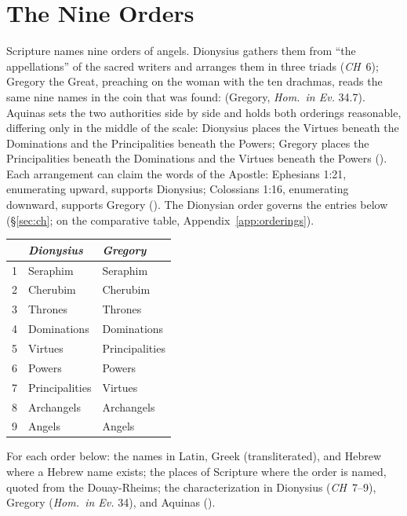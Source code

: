 \section{The Nine Orders}\label{app:orders}

Scripture names nine orders of angels. Dionysius gathers them from
``the appellations'' of the sacred writers and arranges them in three
triads (\emph{CH}~6); Gregory the Great, preaching on the woman with
the ten drachmas, reads the same nine names in the coin that was found:
 (Gregory, \emph{Hom.\ in Ev.} 34.7). Aquinas sets the two
authorities side by side and holds both orderings reasonable, differing
only in the middle of the scale: Dionysius places the Virtues beneath
the Dominations and the Principalities beneath the Powers; Gregory
places the Principalities beneath the Dominations and the Virtues
beneath the Powers (). Each arrangement can claim
the words of the Apostle: Ephesians 1:21, enumerating upward, supports
Dionysius; Colossians 1:16, enumerating downward, supports Gregory
(). The Dionysian order governs the entries
below (\S\ref{sec:ch}; on the comparative table,
Appendix~\ref{app:orderings}).

\begin{center}
\footnotesize
\begin{tabular}{@{}cll@{}}
\toprule
& \emph{Dionysius} & \emph{Gregory} \\
\midrule
1 & Seraphim & Seraphim \\
2 & Cherubim & Cherubim \\
3 & Thrones & Thrones \\
4 & Dominations & Dominations \\
5 & Virtues & Principalities \\
6 & Powers & Powers \\
7 & Principalities & Virtues \\
8 & Archangels & Archangels \\
9 & Angels & Angels \\
\bottomrule
\end{tabular}
\end{center}

For each order below: the names in Latin, Greek (transliterated), and
Hebrew where a Hebrew name exists; the places of Scripture where the
order is named, quoted from the Douay-Rheims; the characterization in
Dionysius (\emph{CH}~7--9), Gregory (\emph{Hom.\ in Ev.} 34), and
Aquinas ().

